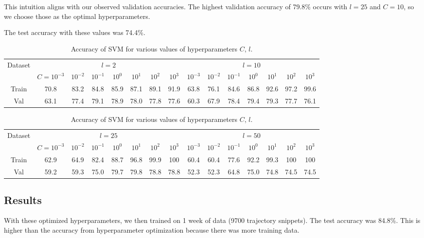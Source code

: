 This intuition aligns with our observed validation accuracies.
The highest validation accuracy of 79.8\% occurs with $l=25$ and $C=10$, so we choose those as the optimal hyperparameters.

The test accuracy with these values was 74.4\%.

\begin{table}[ht!]
\centering
\begin{tabular}{||c| c c c c c c c| c c c c c c c||}  
 \hline
 \multirow{2}{*}{Dataset} &
       \multicolumn{7}{c|}{$l=2$} &
       \multicolumn{7}{c||}{$l=10$} \\
 & $C=10^{-3}$ & $10^{-2}$ & $10^{-1}$ & $10^{0}$ & $10^{1}$ & $10^{2}$ & $10^{3}$ & $10^{-3}$ & $10^{-2}$ & $10^{-1}$ & $10^{0}$ & $10^{1}$ & $10^{2}$ & $10^{3}$ \\ [0.5ex] 
 \hline\hline
 Train & 70.8 & 83.2 & 84.8 & 85.9 & 87.1 & 89.1 & 91.9 & 63.8 & 76.1 & 84.6 & 86.8 & 92.6 & 97.2 & 99.6  \\ \hline
 Val & 63.1 & 77.4 & 79.1 & 78.9 & 78.0 & 77.8 & 77.6 & 60.3 & 67.9 & 78.4 & 79.4 & 79.3 & 77.7 & 76.1  \\ \hline
\end{tabular}
\begin{tabular}{||c| c c c c c c c| c c c c c c c||}  
 \hline
 \multirow{2}{*}{Dataset} &
       \multicolumn{7}{c|}{$l=25$} &
       \multicolumn{7}{c||}{$l=50$} \\
 & $C=10^{-3}$ & $10^{-2}$ & $10^{-1}$ & $10^{0}$ & $10^{1}$ & $10^{2}$ & $10^{3}$ & $10^{-3}$ & $10^{-2}$ & $10^{-1}$ & $10^{0}$ & $10^{1}$ & $10^{2}$ & $10^{3}$ \\ [0.5ex] 
 \hline\hline
 Train & 62.9 & 64.9 & 82.4 & 88.7 & 96.8 & 99.9 & 100 & 60.4 & 60.4 & 77.6 & 92.2 & 99.3 & 100 & 100  \\ \hline
 Val & 59.2 & 59.3 & 75.0 & 79.7 & 79.8 & 78.8 & 78.8 & 52.3 & 52.3 & 64.8 & 75.0 & 74.8 & 74.5 & 74.5  \\ \hline
\end{tabular}
\caption{Accuracy of SVM for various values of hyperparameters $C$, $l$.}
\label{table_svm}
\end{table}

\subsection{Results}
With these optimized hyperparameters, we then trained on 1 week of data (9700 trajectory snippets).
The test accuracy was 84.8\%.
This is higher than the accuracy from hyperparameter optimization because there was more training data.

